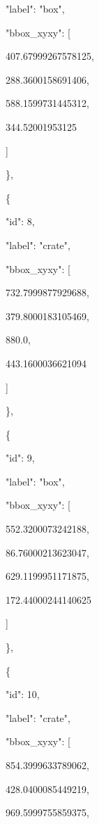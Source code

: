 \documentclass[10pt,a4paper]{article}
\begin{document}
      "label":\allowbreak{} "box",\allowbreak{}\par
      "bbox\_xyxy":\allowbreak{} [\par
        407.67999267578125,\allowbreak{}\par
        288.3600158691406,\allowbreak{}\par
        588.1599731445312,\allowbreak{}\par
        344.52001953125\par
      ]\par
    \},\allowbreak{}\par
    \{\par
      "id":\allowbreak{} 8,\allowbreak{}\par
      "label":\allowbreak{} "crate",\allowbreak{}\par
      "bbox\_xyxy":\allowbreak{} [\par
        732.7999877929688,\allowbreak{}\par
        379.8000183105469,\allowbreak{}\par
        880.0,\allowbreak{}\par
        443.1600036621094\par
      ]\par
    \},\allowbreak{}\par
    \{\par
      "id":\allowbreak{} 9,\allowbreak{}\par
      "label":\allowbreak{} "box",\allowbreak{}\par
      "bbox\_xyxy":\allowbreak{} [\par
        552.3200073242188,\allowbreak{}\par
        86.76000213623047,\allowbreak{}\par
        629.1199951171875,\allowbreak{}\par
        172.44000244140625\par
      ]\par
    \},\allowbreak{}\par
    \{\par
      "id":\allowbreak{} 10,\allowbreak{}\par
      "label":\allowbreak{} "crate",\allowbreak{}\par
      "bbox\_xyxy":\allowbreak{} [\par
        854.3999633789062,\allowbreak{}\par
        428.0400085449219,\allowbreak{}\par
        969.5999755859375,\allowbreak{}\par
\end{document}
